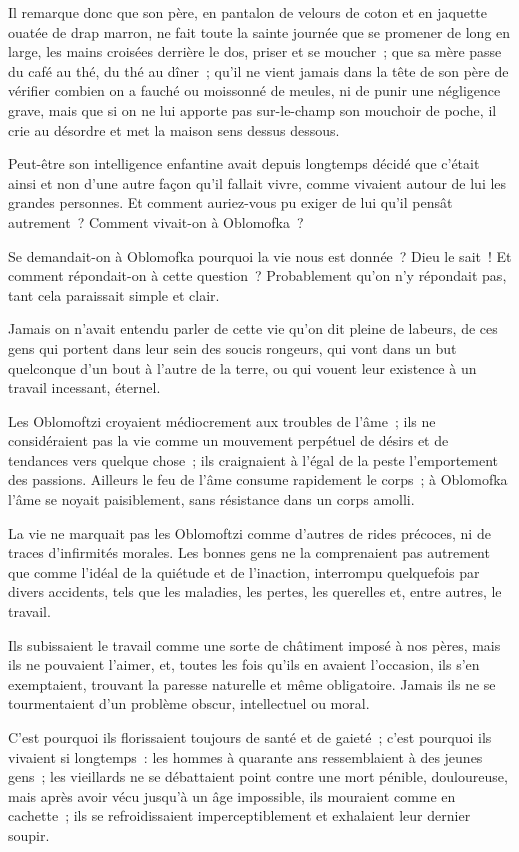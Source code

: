 \documentclass[french,twoside]{book} %
\begin{document}
Il remarque donc que son père, en pantalon de velours de coton et en jaquette ouatée de drap marron, ne fait toute la sainte journée que se promener de long en large, les mains croisées derrière le dos, priser et se moucher ; que sa mère passe du café au thé, du thé au dîner ; qu’il ne vient jamais dans la tête de son père de vérifier combien on a fauché ou moissonné de meules, ni de punir une négligence grave, mais que si on ne lui apporte pas sur-le-champ son mouchoir de poche, il crie au désordre et met la maison sens dessus dessous.\par
Peut-être son intelligence enfantine avait depuis longtemps décidé que c’était ainsi et non d’une autre façon qu’il fallait vivre, comme vivaient autour de lui les grandes personnes. Et comment auriez-vous pu exiger de lui qu’il pensât autrement ? Comment vivait-on à Oblomofka ?\par
Se demandait-on à Oblomofka pourquoi la vie nous est donnée ? Dieu le sait ! Et comment répondait-on à cette question ? Probablement qu’on n’y répondait pas, tant cela paraissait simple et clair.\par
Jamais on n’avait entendu parler de cette vie qu’on dit pleine de labeurs, de ces gens qui portent dans leur sein des soucis rongeurs, qui vont dans un but quelconque d’un bout à l’autre de la terre, ou qui vouent leur existence à un travail incessant, éternel.\par
Les Oblomoftzi croyaient médiocrement aux troubles de l’âme ; ils ne considéraient pas la vie comme un mouvement perpétuel de désirs et de tendances vers quelque chose ; ils craignaient à l’égal de la peste l’emportement des passions. Ailleurs le feu de l’âme consume rapidement le corps ; à Oblomofka l’âme se noyait paisiblement, sans résistance dans un corps amolli.\par
La vie ne marquait pas les Oblomoftzi comme d’autres de rides précoces, ni de traces d’infirmités morales. Les bonnes gens ne la comprenaient pas autrement que comme l’idéal de la quiétude et de l’inaction, interrompu quelquefois par divers accidents, tels que les maladies, les pertes, les querelles et, entre autres, le travail.\par
Ils subissaient le travail comme une sorte de châtiment imposé à nos pères, mais ils ne pouvaient l’aimer, et, toutes les fois qu’ils en avaient l’occasion, ils s’en exemptaient, trouvant la paresse naturelle et même obligatoire. Jamais ils ne se tourmentaient d’un problème obscur, intellectuel ou moral.\par
C’est pourquoi ils florissaient toujours de santé et de gaieté ; c’est pourquoi ils vivaient si longtemps : les hommes à quarante ans ressemblaient à des jeunes gens ; les vieillards ne se débattaient point contre une mort pénible, douloureuse, mais après avoir vécu jusqu’à un âge impossible, ils mouraient comme en cachette ; ils se refroidissaient imperceptiblement et exhalaient leur dernier soupir.\par
\end{document}

